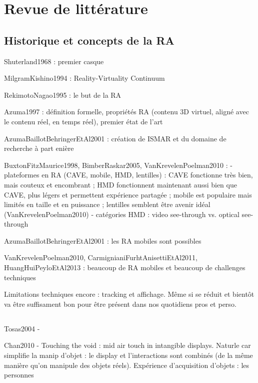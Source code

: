 \chapter{Revue de littérature}
\label{ch:litterature}

\section{Historique et concepts de la RA}
Shuterland1968 : premier casque

MilgramKishino1994 : Reality-Virtuality Continuum

RekimotoNagao1995 : le but de la RA 

Azuma1997 : définition formelle, propriétés RA (contenu 3D virtuel, aligné avec le contenu réel, en temps réel), premier état de l'art

AzumaBaillotBehringerEtAl2001 : création de ISMAR et du domaine de recherche à part enière

BuxtonFitzMaurice1998, BimberRaskar2005, VanKrevelenPoelman2010 : 
- plateformes en RA (CAVE, mobile, HMD, lentilles) : CAVE fonctionne très bien, mais couteux et encombrant ; HMD fonctionnent maintenant aussi bien que CAVE, plus légers et permettent expérience partagée ; mobile est populaire mais limités en taille et en puissance ; lentilles semblent être avenir idéal (VanKrevelenPoelman2010)
- catégories HMD : video see-through vs. optical see-through

AzumaBaillotBehringerEtAl2001 : les RA mobiles sont possibles

VanKrevelenPoelman2010, CarmignianiFurhtAnisettiEtAl2011, HuangHuiPeyloEtAl2013 : beaucoup de RA mobiles et beaucoup de challenges techniques

Limitations techniques encore : tracking et affichage. Même si se réduit et bientôt va être suffisament bon pour être présent dans nos quotidiens pros et perso.


\section{}
Tosas2004 - 

Chan2010 - Touching the void : mid air touch in intangible displays. Naturle car simplifie la manip d'objet : le display et l'interactions sont combinés (de la même manière qu'on manipule des objets réels). Expérience d'acquisition d'objets : les personnes 